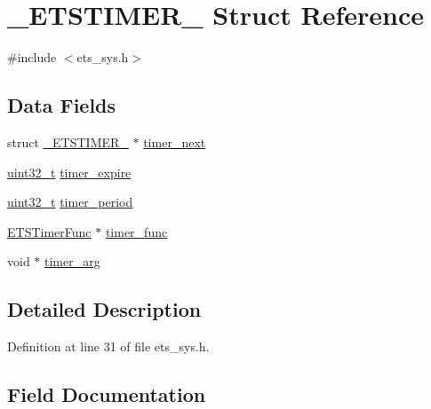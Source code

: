 \hypertarget{struct__ETSTIMER__}{}\section{\+\_\+\+E\+T\+S\+T\+I\+M\+E\+R\+\_\+ Struct Reference}
\label{struct__ETSTIMER__}


{\ttfamily \#include $<$ets\+\_\+sys.\+h$>$}

\subsection*{Data Fields}
\begin{DoxyCompactItemize}
\item 
struct \hyperlink{struct__ETSTIMER__}{\+\_\+\+E\+T\+S\+T\+I\+M\+E\+R\+\_\+} $\ast$ \hyperlink{struct__ETSTIMER___a6835174d54718f900f1dd6fdd5194419}{timer\+\_\+next}
\item 
\hyperlink{send_8c_a435d1572bf3f880d55459d9805097f62}{uint32\+\_\+t} \hyperlink{struct__ETSTIMER___a34542a46b29211ca7f72e4d0bb2dfd60}{timer\+\_\+expire}
\item 
\hyperlink{send_8c_a435d1572bf3f880d55459d9805097f62}{uint32\+\_\+t} \hyperlink{struct__ETSTIMER___ad6bdd67bbd00c9d2a30052e82aac2c9a}{timer\+\_\+period}
\item 
\hyperlink{ets__sys_8h_a9b98fc011315c1e79ebaf55e92265afa}{E\+T\+S\+Timer\+Func} $\ast$ \hyperlink{struct__ETSTIMER___afaaff07c40e4f2b2c4de07d60981c910}{timer\+\_\+func}
\item 
void $\ast$ \hyperlink{struct__ETSTIMER___ac088ddf257850948040acf7399c9715a}{timer\+\_\+arg}
\end{DoxyCompactItemize}


\subsection{Detailed Description}


Definition at line 31 of file ets\+\_\+sys.\+h.



\subsection{Field Documentation}
